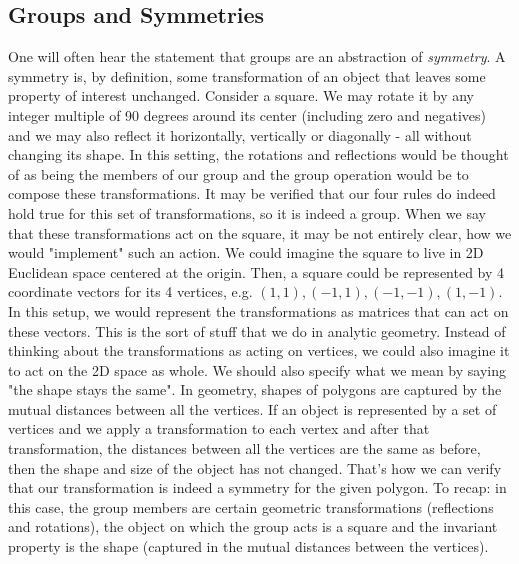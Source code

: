 


\subsection{Groups and Symmetries}
One will often hear the statement that groups are an abstraction of \emph{symmetry}. A symmetry is, by definition, some transformation of an object that leaves some property of interest unchanged. Consider a square. We may rotate it by any integer multiple of 90 degrees around its center (including zero and negatives) and we may also reflect it horizontally, vertically or diagonally - all without changing its shape. In this setting, the rotations and reflections would be thought of as being the members of our group and the group operation would be to compose these transformations. It may be verified that our four rules do indeed hold true for this set of transformations, so it is indeed a group. When we say that these transformations act on the square, it may be not entirely clear, how we would "implement" such an action. We could imagine the square to live in 2D Euclidean space centered at the origin. Then, a square could be represented by 4 coordinate vectors for its 4 vertices, e.g. $(1,1),(-1,1),(-1,-1),(1,-1)$. In this setup, we would represent the transformations as matrices that can act on these vectors. This is the sort of stuff that we do in analytic geometry. Instead of thinking about the transformations as acting on vertices, we could also imagine it to act on the 2D space as whole. We should also specify what we mean by saying "the shape stays the same". In geometry, shapes of polygons are captured by the mutual distances between all the vertices. If an object is represented by a set of vertices and we apply a transformation to each vertex and after that transformation, the distances between all the vertices are the same as before, then the shape and size of the object has not changed. That's how we can verify that our transformation is indeed a symmetry for the given polygon. To recap: in this case, the group members are certain geometric transformations (reflections and rotations), the object on which the group acts is a square and the invariant property is the shape (captured in the mutual distances between the vertices).
